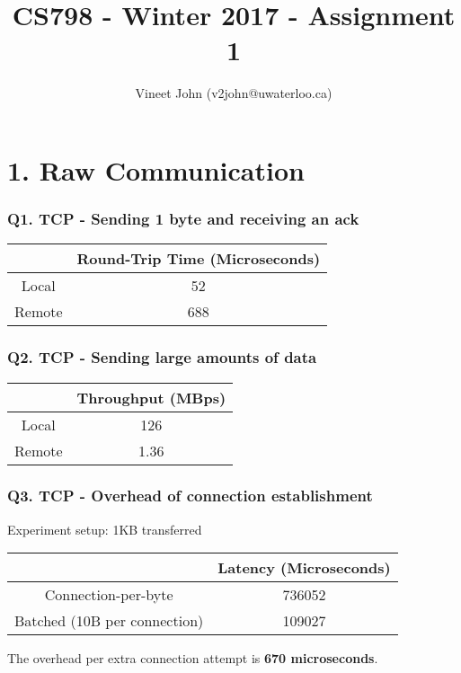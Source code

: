 \documentclass[a4paper]{article}
\title{CS798 - Winter 2017 - Assignment 1}
\author{Vineet John (v2john@uwaterloo.ca)}
\date{}
\begin{document}
\maketitle

\part*{1. Raw Communication}

\section*{Q1. TCP - Sending 1 byte and receiving an ack}
\begin{center}
	\begin{tabular}{ |c|c| } 
		\hline
		& Round-Trip Time (Microseconds) \\ 
		\hline
		\hline
		Local & 52 \\ 
		\hline
		Remote & 688 \\ 
		\hline
	\end{tabular}
\end{center}

\section*{Q2. TCP - Sending large amounts of data}
\begin{center}
	\begin{tabular}{ |c|c| } 
		\hline
		& Throughput (MBps) \\ 
		\hline
		\hline
		Local & 126 \\ 
		\hline
		Remote & 1.36 \\ 
		\hline
	\end{tabular}
\end{center}

\section*{Q3. TCP - Overhead of connection establishment}
Experiment setup: 1KB transferred
\begin{center}
	\begin{tabular}{ |c|c| } 
		\hline
		& Latency (Microseconds) \\ 
		\hline
		\hline
		Connection-per-byte & 736052 \\ 
		\hline
		Batched (10B per connection) & 109027 \\ 
		\hline
	\end{tabular}
\end{center}
The overhead per extra connection attempt is \textbf{670 microseconds}.
\end{document}
